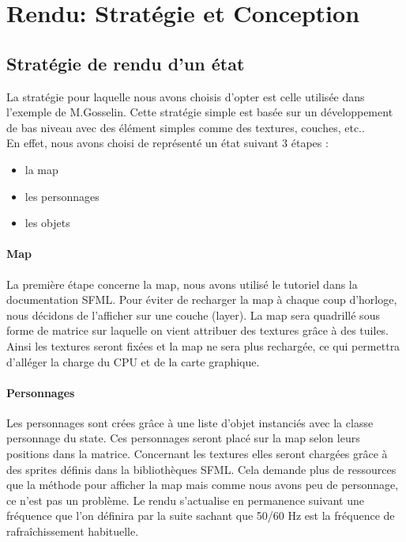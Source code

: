 \documentclass[a4paper,12pt]{article}
\begin{document}
\clearpage
\section{Rendu: Stratégie et Conception}

\subsection{Stratégie de rendu d'un état}
La stratégie pour laquelle nous avons choisis d'opter est celle utilisée dans l'exemple de M.Gosselin. Cette stratégie simple est basée sur un développement de bas niveau avec des élément simples comme des textures, couches, etc..\\
En effet, nous avons choisi de représenté un état suivant 3 étapes :\\
\begin{itemize}
\item la map 
\item les personnages
\item les objets\\
\end{itemize}
\par 
\paragraph{Map}
La première étape concerne la map, nous avons utilisé le tutoriel dans la documentation SFML. Pour éviter de recharger la map à chaque coup d'horloge, nous décidons de l'afficher sur une couche (layer). La map sera quadrillé sous forme de matrice sur laquelle on vient attribuer des textures grâce à des tuiles. Ainsi les textures seront fixées et la map ne sera plus rechargée, ce qui permettra d'alléger la charge du CPU et de la carte graphique.\\
\paragraph{Personnages}
Les personnages sont crées grâce à une liste d'objet instanciés avec la classe personnage du state. Ces personnages seront placé sur la map selon leurs positions dans la matrice. Concernant les textures elles seront chargées grâce à des sprites définis dans la bibliothèques SFML. Cela demande plus de ressources que la méthode pour afficher la map mais comme nous avons peu de personnage, ce n'est pas un problème. Le rendu s'actualise en permanence suivant une fréquence que l'on définira par la suite sachant que 50/60 Hz est la fréquence de rafraîchissement habituelle.
\end{document}
